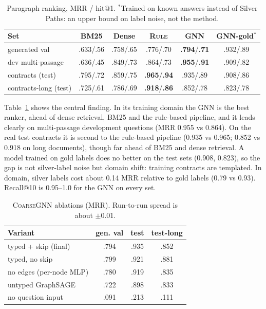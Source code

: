 \documentclass[11pt]{article}
\newcommand{\coarse}{\textsc{CoarseGNN}}
\newcommand{\rulepipe}{\textsc{Rule}}
\begin{document}
\begin{table}[t]
\centering
\scriptsize
\setlength{\tabcolsep}{3pt}
\begin{tabular}{@{}lccccc@{}}
\toprule
\textbf{Set} & \textbf{BM25} & \textbf{Dense} & \textbf{\rulepipe{}} & \textbf{GNN} & \textbf{GNN-gold}$^*$ \\
\midrule
generated val & .633/.56 & .758/.65 & .776/.70 & \textbf{.794}/\textbf{.71} & .932/.89 \\
dev multi-passage & .636/.45 & .849/.73 & .864/.73 & \textbf{.955}/\textbf{.91} & .909/.82 \\
contracts (test) & .795/.72 & .859/.75 & \textbf{.965}/\textbf{.94} & .935/.89 & .908/.86 \\
contracts-long (test) & .725/.61 & .786/.69 & \textbf{.918}/\textbf{.86} & .852/.78 & .823/.78 \\
\bottomrule
\end{tabular}
\caption{Paragraph ranking, MRR / hit@1. $^*$Trained on known answers instead of Silver Paths: an upper bound on label noise, not the method.}
\label{tab:ranking}
\end{table}

Table~\ref{tab:ranking} shows the central finding. In its training domain the GNN is the best ranker, ahead of dense retrieval, BM25 and the rule-based pipeline, and it leads clearly on multi-passage development questions (MRR 0.955 vs 0.864). On the real test contracts it is second to the rule-based pipeline (0.935 vs 0.965; 0.852 vs 0.918 on long documents), though far ahead of BM25 and dense retrieval. A model trained on gold labels does no better on the test sets (0.908, 0.823), so the gap is not silver-label noise but domain shift: training contracts are templated. In domain, silver labels cost about 0.14 MRR relative to gold labels (0.79 vs 0.93). Recall@10 is 0.95--1.0 for the GNN on every set.

\begin{table}[t]
\centering
\scriptsize
\begin{tabular}{@{}lccc@{}}
\toprule
\textbf{Variant} & \textbf{gen. val} & \textbf{test} & \textbf{test-long} \\
\midrule
typed + skip (final) & .794 & .935 & .852 \\
typed, no skip & .799 & .921 & .881 \\
no edges (per-node MLP) & .780 & .919 & .835 \\
untyped GraphSAGE & .722 & .898 & .833 \\
no question input & .091 & .213 & .111 \\
\bottomrule
\end{tabular}
\caption{\coarse{} ablations (MRR). Run-to-run spread is about $\pm$0.01.}
\label{tab:ablation}
\end{table}
\end{document}
